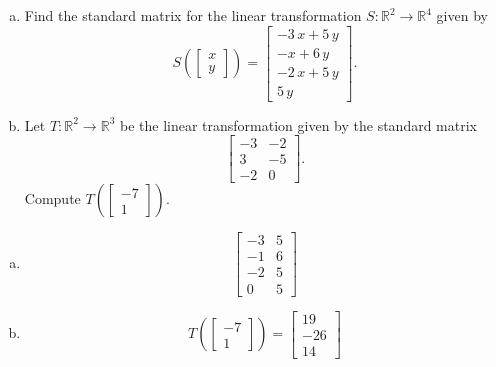 
\begin{exerciseStatement}

\begin{enumerate}[(a)]
\item Find the standard matrix for the linear transformation \(S:\mathbb{R}^ 2  \to \mathbb{R}^ 4 \) given by \[S\left(  \left[\begin{array}{c}
x \\
y
\end{array}\right]  \right) =  \left[\begin{array}{c}
-3 \, x + 5 \, y \\
-x + 6 \, y \\
-2 \, x + 5 \, y \\
5 \, y
\end{array}\right] .\]
\item Let \(T:\mathbb{R}^ 2  \to \mathbb{R}^ 3 \) be the linear transformation given by the standard matrix \[ \left[\begin{array}{cc}
-3 & -2 \\
3 & -5 \\
-2 & 0
\end{array}\right] .\] Compute \(T\left( \left[\begin{array}{c}
-7 \\
1
\end{array}\right]  \right)\). 
\end{enumerate}
    
\end{exerciseStatement}
    
\begin{exerciseAnswer} 

\begin{enumerate}[(a)]
\item \[ \left[\begin{array}{cc}
-3 & 5 \\
-1 & 6 \\
-2 & 5 \\
0 & 5
\end{array}\right] \]
\item \[T\left( \left[\begin{array}{c}
-7 \\
1
\end{array}\right]  \right)= \left[\begin{array}{c}
19 \\
-26 \\
14
\end{array}\right] \]
\end{enumerate}
    
\end{exerciseAnswer}
    
